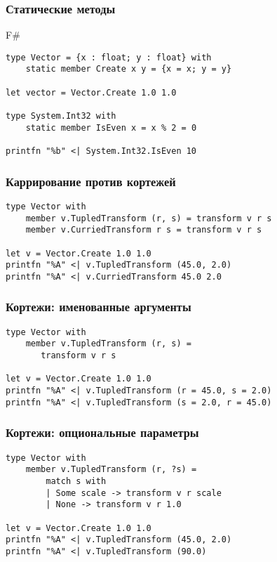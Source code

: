 \documentclass[xetex,mathserif,serif]{beamer}
\begin{document}
	\begin{frame}[fragile]
		\frametitle{Статические методы}
		\begin{exampleblock}{F\#}
			\begin{verbatim}
type Vector = {x : float; y : float} with
    static member Create x y = {x = x; y = y}

let vector = Vector.Create 1.0 1.0

type System.Int32 with
    static member IsEven x = x % 2 = 0

printfn "%b" <| System.Int32.IsEven 10
			\end{verbatim}
		\end{exampleblock}
\end{frame}

	\begin{frame}[fragile]
		\frametitle{Каррирование против кортежей}
		\begin{verbatim}
type Vector with
    member v.TupledTransform (r, s) = transform v r s
    member v.CurriedTransform r s = transform v r s

let v = Vector.Create 1.0 1.0
printfn "%A" <| v.TupledTransform (45.0, 2.0)
printfn "%A" <| v.CurriedTransform 45.0 2.0
		\end{verbatim}
\end{frame}

	\begin{frame}[fragile]
		\frametitle{Кортежи: именованные аргументы}
		\begin{verbatim}
type Vector with
    member v.TupledTransform (r, s) = 
       transform v r s

let v = Vector.Create 1.0 1.0
printfn "%A" <| v.TupledTransform (r = 45.0, s = 2.0)
printfn "%A" <| v.TupledTransform (s = 2.0, r = 45.0)
		\end{verbatim}
\end{frame}

	\begin{frame}[fragile]
		\frametitle{Кортежи: опциональные параметры}
		\begin{verbatim}
type Vector with
    member v.TupledTransform (r, ?s) = 
        match s with
        | Some scale -> transform v r scale
        | None -> transform v r 1.0

let v = Vector.Create 1.0 1.0
printfn "%A" <| v.TupledTransform (45.0, 2.0)
printfn "%A" <| v.TupledTransform (90.0)
		\end{verbatim}
\end{frame}
\end{document}
